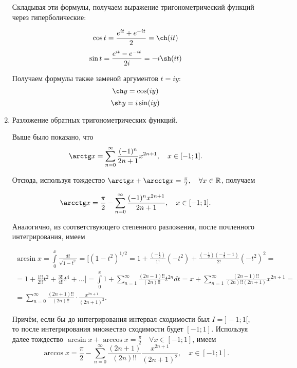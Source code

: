 \documentclass[../../main.tex]{subfiles}
\begin{document}
\begin{enumerate}
        Складывая эти формулы, получаем выражение тригонометрический функций 
        через гиперболические:
        
        \[ \cos t = \frac{e^{it} + e^{-it}}{2} = \ch (it) \]
        \[ \sin t = \frac{e^{it} - e^{-it}}{2i} = -i\sh (it) \]
        
        Получаем формулы также заменой аргументов $t = iy$:
        \[ \ch y = \cos(iy)\]
        \[\sh y = i \sin (iy)\]
        
        \item Разложение обратных тригонометрических функций.
        
        Выше было показано, что 
        \[ \arctg x = \sum\limits_{n = 0}^{\infty} \frac{(-1)^n}{2n + 1}
        x^{2n+1}, \quad x \in [-1;1]. \]
        
        Отсюда, используя тождество $\arctg x + \arcctg x = \frac{\pi}{2}, 
        \quad \forall x \in \R$, получаем 
        
        \[ \arcctg x = \frac{\pi}{2} - \sum\limits_{n = 0}^{\infty} 
        \frac{(-1)^nx^{2n+1}}{2n + 1}, \quad x \in [-1; 1]. \]
        
        Аналогично, из соответствующего степенного разложения, после 
        почленного интегрирования, имеем
    
        \begin{multline*}
            \arcsin x = \int\limits_{0}^{x} \frac{dt}{\sqrt{1 - t^2}} =
            [(1 - t^2)^{1/2} = 1 + \frac{(-\frac12)}{1!}(-t^2) + 
            \frac{(-\frac12)(-\frac12 - 1)}{2!}(-t^2)^2 = \\ =
            1 + \frac{1!!}{2!!}t^2 + \frac{3!!}{4!!}t^4 + \ldots ] = 
            \int\limits_{0}^{x} 1 + \sum\limits_{n = 1}^{\infty} 
            \frac{(2n-1)!!}{(2n)!!} t^{2n}dt = x + \sum\limits_{n = 
            1}^{\infty} 
            \frac{(2n-1)!!}{(2n)!!(2n+1)}x^{2n+1} = \\ = 
            \sum\limits_{n = 0}^{\infty} \frac{(2n + 1)!!}{(2n)!!} 
            \cdot \frac{x^{2n+1}}{(2n+1)^2}.
        \end{multline*}
        
        Причём, если бы до интегрирования интервал сходимости был $I = 
        ]-1;1[$, 
        то после интегрирования множество сходимости будет $[-1;1]$.
        Используя далее тождество $\arcsin x + \arccos x = \frac{\pi}{2} \quad 
        \forall x \in [-1; 1]$, имеем \[ \arccos x = \frac{\pi}{2} - 
        \sum\limits_{n = 0}^{\infty} \frac{(2n + 1)}{(2n)!!} 
        \frac{x^{2n + 1}}{(2n + 1)^2}, \quad x \in [-1; 1].\]
        

\end{enumerate}
\end{document}
